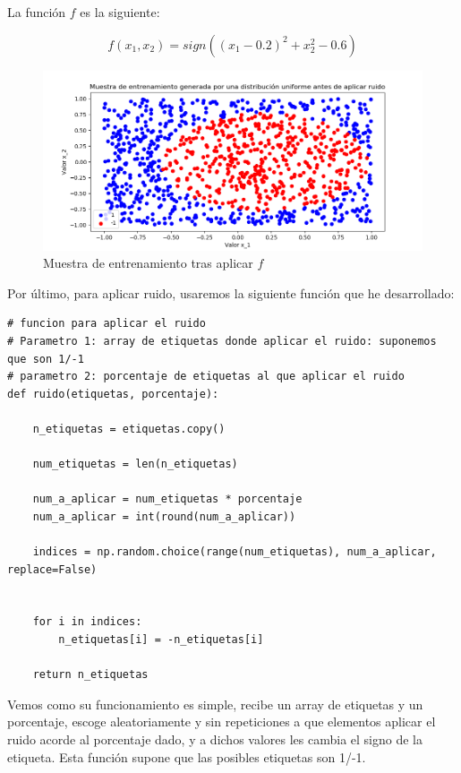 \documentclass[12pt, spanish]{article}
\begin{document}
La función $f$ es la siguiente:

$$ f(x_1,x_2) = sign((x_1 - 0.2)^2 + x_2^2 - 0.6)  $$


\begin{figure}[H]
  \centering
      \includegraphics[scale = 0.70]{muestra-f.png}
 		 \caption{Muestra de entrenamiento tras aplicar $f$}
  		\label{fig:ej2-2-m-f}

\end{figure}

Por último, para aplicar ruido, usaremos la siguiente función que he desarrollado:

\begin{lstlisting}
# funcion para aplicar el ruido
# Parametro 1: array de etiquetas donde aplicar el ruido: suponemos que son 1/-1
# parametro 2: porcentaje de etiquetas al que aplicar el ruido
def ruido(etiquetas, porcentaje):

	n_etiquetas = etiquetas.copy()

	num_etiquetas = len(n_etiquetas)

	num_a_aplicar = num_etiquetas * porcentaje
	num_a_aplicar = int(round(num_a_aplicar))

	indices = np.random.choice(range(num_etiquetas), num_a_aplicar, replace=False)


	for i in indices:
		n_etiquetas[i] = -n_etiquetas[i]

	return n_etiquetas
\end{lstlisting}

\newpage

Vemos como su funcionamiento es simple, recibe un array de etiquetas y un porcentaje, escoge aleatoriamente y sin repeticiones a que elementos aplicar el ruido acorde al porcentaje dado, y a dichos valores les cambia el signo de la etiqueta. Esta función supone que las posibles etiquetas son 1/-1.
\end{document}
